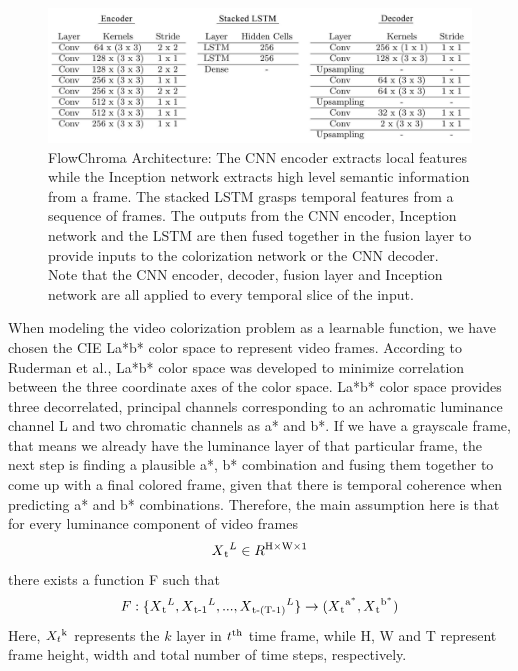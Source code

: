 \documentclass[10pt,twocolumn,letterpaper]{article}
\begin{document}
\begin{figure}
	\includegraphics[width=\textwidth]{kernel-stride-table_1.jpg}
    \caption{FlowChroma Architecture: The CNN encoder extracts local features while the Inception network extracts high level semantic information from a frame. The stacked LSTM grasps temporal features from a sequence of frames. The outputs from the CNN encoder, Inception network and the LSTM are then fused together in the fusion layer to provide inputs to the colorization network or the CNN decoder. Note that the CNN encoder, decoder, fusion layer and Inception network are all applied to every temporal slice of the input.}
\end{figure}

When modeling the video colorization problem as a learnable function, we have chosen the CIE La*b* color space to represent video frames. According to Ruderman et al.\cite{Ruderman98statisticsof}, La*b* color space was developed to minimize correlation between the three coordinate axes of the color space. La*b* color space provides three decorrelated, principal channels corresponding to an achromatic luminance channel L and two chromatic channels as a* and b*. 
If we have a grayscale frame, that means we already have the luminance layer of that particular frame, the next step is finding a plausible a*, b* combination and fusing them together to come up with a final colored frame, given that there is temporal coherence when predicting a* and b* combinations. Therefore, the main assumption here is that for every luminance component of video frames \begin{equation} X\textsubscript{t}^L\in R\textsuperscript{H$\times$W$\times$1} \end{equation} there exists a function F such that \begin{equation}F: \{X\textsubscript{t}^L, X\textsubscript{t-1}^L,..., X\textsubscript{t-(T-1)}^L\} \rightarrow (X\textsubscript{t}\textsuperscript{a$^\ast$}, 
X\textsubscript{t}\textsuperscript{b$^\ast$})\end{equation}  
Here, $X_{t}\textsuperscript{k}$ represents the $k$ layer in $t\textsuperscript{th}$ time frame, while H, W and T represent frame height, width and total number of time steps, respectively.
\end{document}
